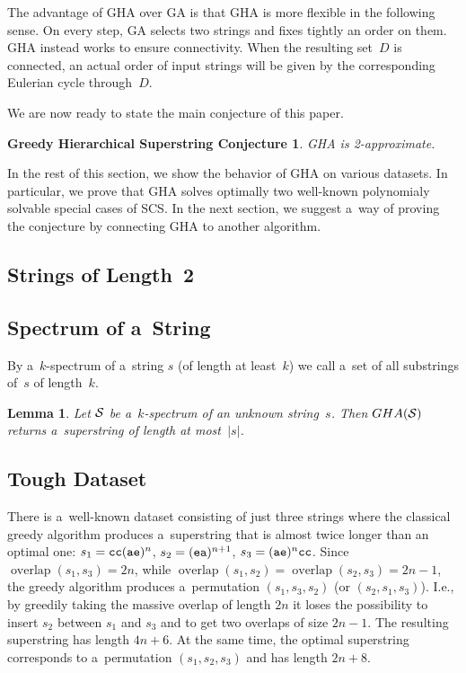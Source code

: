 \documentclass[11pt]{article}
\newtheorem{lemma}{Lemma}
\DeclareMathOperator{\overlap}{overlap}
\begin{document}
The advantage of GHA over GA is that GHA is more flexible in the following sense. On every step, GA selects two strings and fixes tightly an order on them. GHA instead works to ensure connectivity. When the resulting set~$D$ is connected, an actual order of input strings will be given by the corresponding Eulerian cycle through~$D$.

We are now ready to state the main conjecture of this paper.
\newtheorem*{ghcc}{Greedy Hierarchical Superstring Conjecture}
\begin{ghcc}
GHA is 2-approximate.
\end{ghcc}
In the rest of this section, we show the behavior of GHA on various datasets. In particular, we prove that GHA solves optimally two well-known polynomialy solvable special cases of SCS. In the next section, we suggest a~way of proving the conjecture by connecting GHA to another algorithm.


\subsection{Strings of Length~2}

\subsection{Spectrum of a~String}
By a~$k$-spectrum of a~string $s$ 
(of length at least~$k$)
we call a~set of all substrings of~$s$ of length~$k$.

\begin{lemma}
Let ${\cal S}$ be a~$k$-spectrum of an unknown string~$s$. Then $GHA({\cal S})$ returns a~superstring of length at most~$|s|$. 
\end{lemma}

\subsection{Tough Dataset}
There is a~well-known dataset consisting of just three strings where the classical greedy algorithm produces a~superstring that is almost twice longer than an optimal one: $s_1={\tt cc}({\tt ae})^n$, $s_2=({\tt ea})^{n+1}$, $s_3=({\tt ae})^n{\tt cc}$. Since $\overlap(s_1, s_3)=2n$,
 while $\overlap(s_1,s_2)=\overlap(s_2,s_3)=2n-1$, the greedy algorithm produces a~permutation $(s_1, s_3, s_2)$ (or $(s_2,s_1,s_3)$). I.e., by greedily taking the massive overlap of length $2n$ it loses the possibility to insert $s_2$ between $s_1$ and $s_3$ and to get two overlaps of size $2n-1$. The resulting superstring has length $4n+6$. At the same time, the optimal superstring corresponds to a~permutation $(s_1,s_2,s_3)$ and has length $2n+8$.
 
\end{document}

